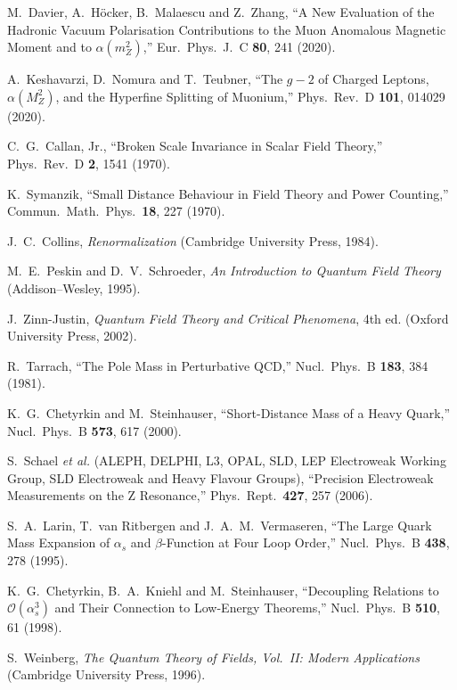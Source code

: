 \documentclass[epjc3]{svjour3}
\begin{document}
\begin{thebibliography}{99}
M.~Davier, A.~H\"ocker, B.~Malaescu and Z.~Zhang,
``A New Evaluation of the Hadronic Vacuum Polarisation Contributions to the Muon Anomalous Magnetic Moment and to $\alpha(m_Z^2)$,''
Eur.\ Phys.\ J.\ C \textbf{80}, 241 (2020).

A.~Keshavarzi, D.~Nomura and T.~Teubner,
``The $g-2$ of Charged Leptons, $\alpha(M_Z^2)$, and the Hyperfine Splitting of Muonium,''
Phys.\ Rev.\ D \textbf{101}, 014029 (2020).

C.~G.~Callan, Jr.,
``Broken Scale Invariance in Scalar Field Theory,''
Phys.\ Rev.\ D \textbf{2}, 1541 (1970).

K.~Symanzik,
``Small Distance Behaviour in Field Theory and Power Counting,''
Commun.\ Math.\ Phys.\ \textbf{18}, 227 (1970).

J.~C.~Collins,
\textit{Renormalization} (Cambridge University Press, 1984).

M.~E.~Peskin and D.~V.~Schroeder,
\textit{An Introduction to Quantum Field Theory} (Addison–Wesley, 1995).

J.~Zinn-Justin,
\textit{Quantum Field Theory and Critical Phenomena}, 4th ed. (Oxford University Press, 2002).

R.~Tarrach,
``The Pole Mass in Perturbative QCD,''
Nucl.\ Phys.\ B \textbf{183}, 384 (1981).

K.~G.~Chetyrkin and M.~Steinhauser,
``Short-Distance Mass of a Heavy Quark,''
Nucl.\ Phys.\ B \textbf{573}, 617 (2000).

S.~Schael \textit{et al.} (ALEPH, DELPHI, L3, OPAL, SLD, LEP Electroweak Working Group, SLD Electroweak and Heavy Flavour Groups),
``Precision Electroweak Measurements on the Z Resonance,''
Phys.\ Rept.\ \textbf{427}, 257 (2006).

S.~A.~Larin, T.~van Ritbergen and J.~A.~M.~Vermaseren,
``The Large Quark Mass Expansion of $\alpha_s$ and $\beta$-Function at Four Loop Order,''
Nucl.\ Phys.\ B \textbf{438}, 278 (1995).

K.~G.~Chetyrkin, B.~A.~Kniehl and M.~Steinhauser,
``Decoupling Relations to $\mathcal{O}(\alpha_s^3)$ and Their Connection to Low-Energy Theorems,''
Nucl.\ Phys.\ B \textbf{510}, 61 (1998).

S.~Weinberg,
\textit{The Quantum Theory of Fields, Vol.\ II: Modern Applications} (Cambridge University Press, 1996).


\end{thebibliography}
\end{document}
